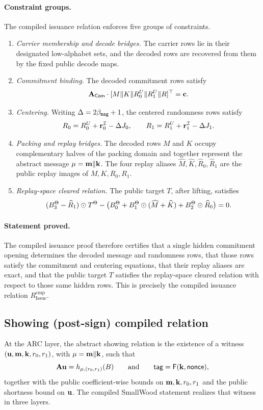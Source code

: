 \paragraph{Constraint groups.}
The compiled issuance relation enforces five groups of constraints.
\begin{enumerate}[leftmargin=1.25em]
    \item \emph{Carrier membership and decode bridges.} The carrier rows lie in their designated low-alphabet sets, and
    the decoded rows are recovered from them by the fixed public decode maps.
    \item \emph{Commitment binding.} The decoded commitment rows satisfy
    \[
    \mathbf{A}_{\mathsf{Com}}\cdot [M\Vert K\Vert R_0^U\Vert R_1^U\Vert R]^\top = \mathbf{c}.
    \]
    \item \emph{Centering.} Writing \(\Delta=2\beta_{\mathtt{msg}}+1\), the centered randomness rows satisfy
    \[
    R_0 = R_0^U + \mathbf{r}_0^{\mathcal{I}} - \Delta J_0,
    \qquad
    R_1 = R_1^U + \mathbf{r}_1^{\mathcal{I}} - \Delta J_1.
    \]
    \item \emph{Packing and replay bridges.} The decoded rows \(M\) and \(K\) occupy complementary halves of the
    packing domain and together represent the abstract message \(\mathbf{\mu}=\mathbf{m}\Vert \mathbf{k}\). The four replay aliases
    \(\widehat M,\widehat K,\widehat R_0,\widehat R_1\) are the public replay images of \(M,K,R_0,R_1\).
    \item \emph{Replay-space cleared relation.} The public target \(T\), after lifting, satisfies
    \[
    (B_3^\Theta-\widehat R_1)\odot T^\Theta
    -
    \bigl(B_0^\Theta + B_1^\Theta\odot(\widehat M+\widehat K)+B_2^\Theta\odot \widehat R_0\bigr)
    =0.
    \]
\end{enumerate}

\paragraph{Statement proved.}
The compiled issuance proof therefore certifies that a single hidden commitment opening determines the decoded message and
randomness rows, that those rows satisfy the commitment and centering equations, that their replay aliases are exact, and
that the public target \(T\) satisfies the replay-space cleared relation with respect to those same hidden rows. This is
precisely the compiled issuance relation \(R_{\mathrm{Issue}}^{\mathrm{cmp}}\).

\subsection{Showing (post-sign) compiled relation}
\label{subsec:smallwood-showing}
\label{subsec:showing-compiled}
At the ARC layer, the abstract showing relation is the existence of a witness
\((\mathbf{u},\mathbf{m},\mathbf{k},r_0,r_1)\), with \(\mathbf{\mu}=\mathbf{m}\Vert \mathbf{k}\), such that
\[
\mathbf{A}\mathbf{u} = h_{\mathbf{\mu},(r_0,r_1)}(B)
\qquad\text{and}\qquad
\mathsf{tag} = \mathsf{F}(\mathbf{k},\mathsf{nonce}),
\]
together with the public coefficient-wise bounds on \(\mathbf{m},\mathbf{k},r_0,r_1\) and the public shortness bound on
\(\mathbf{u}\). The compiled SmallWood statement realizes that witness in three layers.

